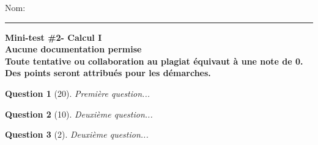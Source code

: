 \documentclass[12pt]{article}
\newcounter{ponderation}
\theoremstyle{question}
\newtheorem{quest}{Question}
\begin{document}
\begin{multicols}{2}
	Nom:\rule{5cm}{1.2pt}
	
	\columnbreak
	
\end{multicols}


\begin{center}
	\null \textbf{Mini-test \#2- Calcul I \\
	Aucune documentation permise\\
	Toute tentative ou collaboration au plagiat \'equivaut \`a une note de 0.\\
	Des points seront attribu\'es pour les d\'emarches.}
\end{center}


\begin{quest}[20] %
	Premi\`ere question...\\
\end{quest}


\begin{quest}[10]
	Deuxi\`eme question...\\
\end{quest}

\begin{quest}[2]
	Deuxi\`eme question...\\
\end{quest}


\makeatletter\edef{}\makeatother\label{totalponderation}
\end{document}
